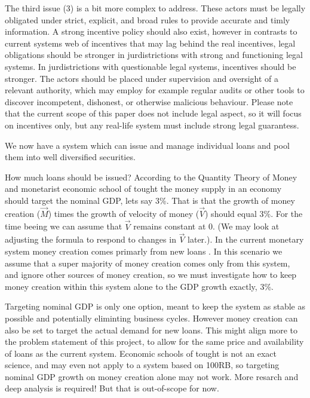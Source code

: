 The third issue (3) is a bit more complex to address. These actors must be legally obligated under strict, explicit, and broad rules to provide accurate and timly information. A strong incentive policy should also exist, however in contrasts to current systems web of incentives that may lag behind the real incentives, legal obligations should be stronger in jurdistrictions with strong and functioning legal systems. In jurdistrictions with questionable legal systems, incentives should be stronger. The actors should be placed under supervision and oversight of a relevant authority, which may employ for example regular audits or other tools to discover incompetent, dishonest, or otherwise malicious behaviour. Please note that the current scope of this paper does not include legal aspect, so it will focus on incentives only, but any real-life system must include strong legal guarantess. 

We now have a system which can issue and manage individual loans and pool them into well diversified securities. 

How much loans should be issued? According to the Quantity Theory of Money and monetarist economic school of tought the money supply in an economy should target the nominal GDP, lets say 3\%. That is that the growth of money creation ($\overrightarrow{M}$) times the growth of velocity of money ($\overrightarrow{V}$) should equal 3\%. For the time beeing we can assume that $\overrightarrow{V}$ remains constant at 0. (We may look at adjusting the formula to respond to changes in $\overrightarrow{V}$ later.). In the current monetary system money creation comes primarly from new loans \cite{chicagorevisited}. In this scenario we assume that a super majority of money creation comes only from this system, and ignore other sources of money creation, so we must investigate how to keep money creation within this system alone to the GDP growth exactly, 3\%. 

Targeting nominal GDP is only one option, meant to keep the system as stable as possible and potentially eliminting business cycles. However money creation can also be set to target the actual demand for new loans. This might align more to the problem statement of this project, to allow for the same price and availability of loans as the current system. Economic schools of tought is not an exact science, and may even not apply to a system based on 100RB, so targeting nominal GDP growth on money creation alone may not work. More resarch and deep analysis is required! But that is out-of-scope for now. 

